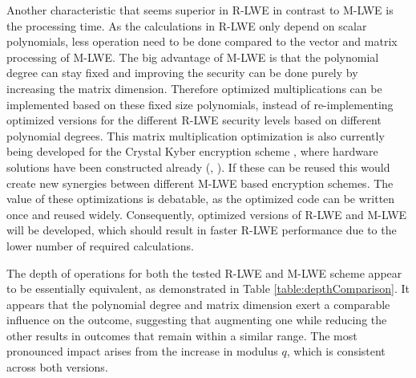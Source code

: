 Another characteristic that seems superior in R-LWE in contrast to M-LWE is the processing time. As the calculations in R-LWE only depend on scalar polynomials, less operation need to be done compared to the vector and matrix processing of M-LWE. The big advantage of M-LWE is that the polynomial degree can stay fixed and improving the security can be done purely by increasing the matrix dimension. Therefore optimized multiplications can be implemented based on these fixed size polynomials, instead of re-implementing optimized versions for the different R-LWE security levels based on different polynomial degrees. This matrix multiplication optimization is also currently being developed for the Crystal Kyber encryption scheme \cite{CyrstalsKyber}, where hardware solutions have been constructed already (\cite{KyberHardware}, \cite{KyberHardware2}). If these can be reused this would create new synergies between different M-LWE based encryption schemes. The value of these optimizations is debatable, as the optimized code can be written once and reused widely. Consequently, optimized versions of R-LWE and M-LWE will be developed, which should result in faster R-LWE performance due to the lower number of required calculations.

The depth of operations for both the tested R-LWE and M-LWE scheme appear to be essentially equivalent, as demonstrated in Table \ref{table:depthComparison}. It appears that the polynomial degree and matrix dimension exert a comparable influence on the outcome, suggesting that augmenting one while reducing the other results in outcomes that remain within a similar range. The most pronounced impact arises from the increase in modulus $q$, which is consistent across both versions.

